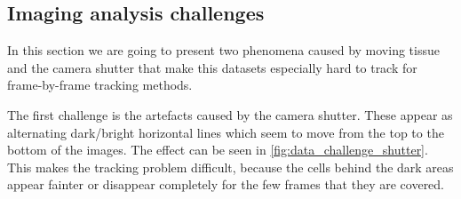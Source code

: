 	\subsection{Imaging analysis challenges \statusfirstdraft}
	\label{sec:data_challenges}
	In this section we are going to present two phenomena caused by moving tissue and the camera shutter that make this datasets especially hard to track for frame-by-frame tracking methods.
	
	The first challenge is the artefacts caused by the camera shutter. These appear as alternating dark/bright horizontal lines which seem to move from the top to the bottom of the images. The effect can be seen in \cref{fig:data_challenge_shutter}. This makes the tracking problem difficult, because the cells behind the dark areas appear fainter or disappear completely for the few frames that they are covered.
		
